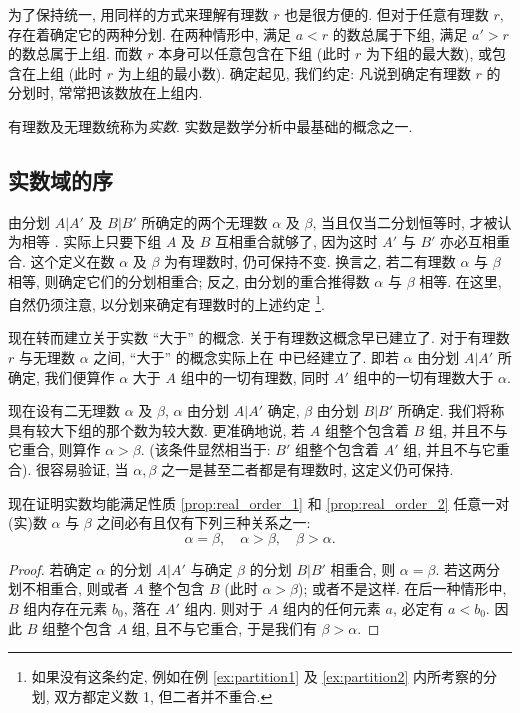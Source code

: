 为了保持统一, 用同样的方式来理解有理数 $r$ 也是很方便的.
但对于任意有理数 $r$, 存在着确定它的两种分划.
在两种情形中, 满足 $a < r$ 的数总属于下组, 满足 $a' > r$ 的数总属于上组.
而数 $r$ 本身可以任意包含在下组 (此时 $r$ 为下组的最大数), 或包含在上组 (此时 $r$ 为上组的最小数).
确定起见, 我们约定: 凡说到确定有理数 $r$ 的分划时, 常常把该数放在上组内.

有理数及无理数统称为\emph{实数}.
实数是数学分析中最基础的概念之一.

\subsection{实数域的序} \label{subsec:7}

{\kaishu
由分划 $A|A'$ 及 $B|B'$ 所确定的两个无理数 $\alpha$ 及 $\beta$, 当且仅当二分划恒等时, 才被认为相等
}.
实际上只要下组 $A$ 及 $B$ 互相重合就够了, 因为这时 $A'$ 与 $B'$ 亦必互相重合.
这个定义在数 $\alpha$ 及 $\beta$ 为有理数时, 仍可保持不变.
换言之, 若二有理数 $\alpha$ 与 $\beta$ 相等, 则确定它们的分划相重合;
反之, 由分划的重合推得数 $\alpha$ 与 $\beta$ 相等.
在这里, 自然仍须注意, 以分划来确定有理数时的上述约定
\footnote{如果没有这条约定, 例如在例 \ref{ex:partition1} 及 \ref{ex:partition2} 内所考察的分划, 双方都定义数 1, 但二者并不重合.}.

现在转而建立关于实数 “大于” 的概念.
关于有理数这概念早已建立了.
对于有理数 $r$ 与无理数 $\alpha$ 之间, “大于” 的概念实际上在  中已经建立了.
即若 $\alpha$ 由分划 $A|A'$ 所确定, 我们便算作 $\alpha$ 大于 $A$ 组中的一切有理数, 同时 $A'$ 组中的一切有理数大于 $\alpha$.

现在设有二无理数 $\alpha$ 及 $\beta$, $\alpha$ 由分划 $A|A'$ 确定, $\beta$ 由分划 $B|B'$ 所确定.
我们将称具有较大下组的那个数为较大数.
更准确地说, 若 $A$ 组整个包含着 $B$ 组, 并且不与它重合, 则算作 $\alpha > \beta$.
(该条件显然相当于: $B'$ 组整个包含着 $A'$ 组, 并且不与它重合).
很容易验证, 当 $\alpha, \beta$ 之一是甚至二者都是有理数时, 这定义仍可保持.

现在证明实数均能满足性质 \ref{prop:real_order_1} 和 \ref{prop:real_order_2}
{\kaishu
    \label{prop:real_order_1} 任意一对(实)数 $\alpha$ 与 $\beta$ 之间必有且仅有下列三种关系之一:
    $$
    \alpha = \beta, \quad \alpha > \beta, \quad \beta > \alpha.
    $$
}

\begin{proof}
    若确定 $\alpha$ 的分划 $A|A'$ 与确定 $\beta$ 的分划 $B|B'$ 相重合, 则 $\alpha = \beta$.
    若这两分划不相重合, 则或者 $A$ 整个包含 $B$ (此时 $\alpha > \beta$); 或者不是这样.
    在后一种情形中, $B$ 组内存在元素 $b_0$, 落在 $A'$ 组内.
    则对于 $A$ 组内的任何元素 $a$, 必定有 $a < b_0$.
    因此 $B$ 组整个包含 $A$ 组, 且不与它重合, 于是我们有 $\beta > \alpha$.
\end{proof}

